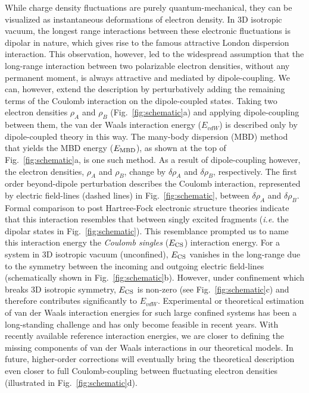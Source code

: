 \documentclass[aps,prl,groupaddress, twocolumn]{revtex4-1}  %
\begin{document}
While charge density fluctuations are purely quantum-mechanical, they can be visualized as instantaneous deformations of electron density. In 3D isotropic vacuum, the longest range interactions between these electronic fluctuations is dipolar in nature, which gives rise to the famous attractive London dispersion interaction. This observation, however, led to the widespread assumption that the long-range interaction between two polarizable electron densities, without any permanent moment, is always attractive and mediated by dipole-coupling. We can, however, extend the description by perturbatively adding the remaining terms of the Coulomb interaction on the dipole-coupled states\cite{sadhukhan_prl_2017}. Taking two electron densities $\rho_A$ and $\rho_B$ (Fig.~\ref{fig:schematic}a) and applying dipole-coupling between them, the van der Waals interaction energy ($E_{vdW}$) is described only by dipole-coupled theory in this way. The many-body dispersion (MBD) method that yields the MBD energy ($E_{\rm MBD}$), as shown at the top of Fig.~\ref{fig:schematic}a, is one such method. As a result of dipole-coupling however, the electron densities, $\rho_A$ and $\rho_B$, change by $\delta \rho_A$ and $\delta \rho_B$, respectively. The first order beyond-dipole perturbation describes the Coulomb interaction, represented by electric field-lines (dashed lines) in Fig.~\ref{fig:schematic}, between $\delta \rho_A$ and $\delta \rho_B$. Formal comparison to post Hartree-Fock electronic structure theories indicate that this interaction resembles that between singly excited fragments (\textit{i.e.} the dipolar states in Fig.~\ref{fig:schematic}). This resemblance prompted us to name this interaction energy the \textit{Coulomb singles} ($E_{\rm CS}$) interaction energy. For a system in 3D isotropic vacuum (unconfined), $E_{\rm CS}$ vanishes in the long-range due to the symmetry between the incoming and outgoing electric field-lines (schematically shown in Fig.~\ref{fig:schematic}b). However, under confinement which breaks 3D isotropic symmetry, $E_{\rm CS}$ is non-zero (see Fig.~\ref{fig:schematic}c) and therefore contributes significantly to $E_{vdW}$. Experimental or theoretical estimation of van der Waals interaction energies for such large confined systems has been a long-standing challenge and has only become feasible in recent years. With recently available reference interaction energies, we are closer to defining the missing components of van der Waals interactions in our theoretical models. In future, higher-order corrections will eventually bring the theoretical description even closer to full Coulomb-coupling between fluctuating electron densities (illustrated in Fig.~\ref{fig:schematic}d).
\end{document}
